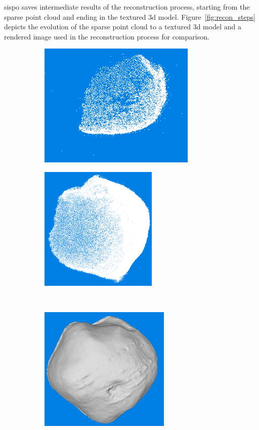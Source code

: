 \Gls{sispo} saves intermediate results of the reconstruction process, starting from the sparse point cloud and ending in the textured \gls{3d} model. Figure~\ref{fig:recon_steps} depicts the evolution of the sparse point cloud to a textured \gls{3d} model and a rendered image used in the reconstruction process for comparison.

\begin{figure}[htbp]
    \centering
    \begin{subfigure}[b]{0.4\textwidth}
        \centering
        \includegraphics[width=\textwidth,height=5.95cm]{doc/thesis/0_figures/models_quality/100_1/120_100_1_points2.png}
        \caption{}
        \label{fig:recon_step_point}
    \end{subfigure}
    \begin{subfigure}[b]{0.4\textwidth}
        \centering
        \includegraphics[width=\textwidth,height=5.95cm]{doc/thesis/0_figures/models_quality/100_1/120_100_1_dense1.png}
        \caption{}
        \label{fig:recon_step_dense}
    \end{subfigure}
    \\
    \begin{subfigure}[b]{0.4\textwidth}
        \centering
        \includegraphics[width=\textwidth,height=5.95cm]{doc/thesis/0_figures/models_quality/100_1/120_100_1_mesh1.png}

\end{subfigure}
\end{figure}
